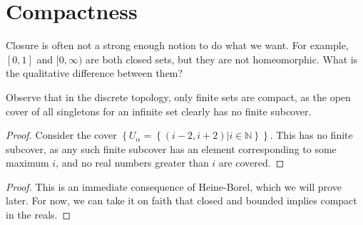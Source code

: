 
\section*{Compactness}

Closure is often not a strong enough notion to do what we want.  For example, $[0,1]$ and $[0,\infty)$ are both closed sets, but they are not homeomorphic.  What is the qualitative difference between them?






Observe that in the discrete topology, only finite sets are compact, as the open cover of all singletons for an infinite set clearly has no finite subcover.

\thrm{The set $[0,\infty)\subset\R$ is not compact.}

\begin{proof}
	
	Consider the cover $\left\{  U_\alpha = \left\{  (i-2,i+2)|i\in\mathbb{N} \right\}       \right\}$.  This has no finite subcover, as any such finite subcover has an element corresponding to some maximum $i$, and no real numbers greater than $i$ are covered.
	
	
\end{proof}


\begin{proof}
	
	This is an immediate consequence of Heine-Borel, which we will prove later.  For now, we can take it on faith that closed and bounded implies compact in the reals.
	
\end{proof}



